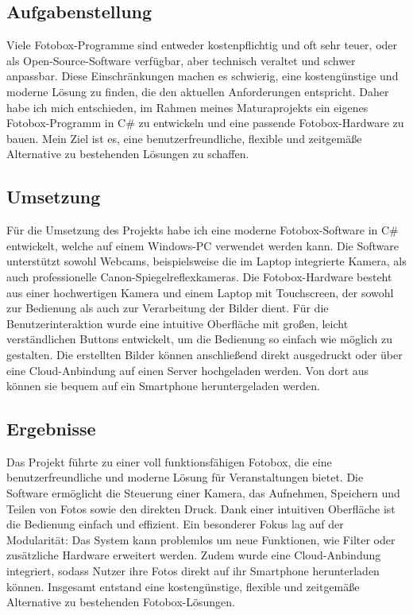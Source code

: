 \subsection{Aufgabenstellung}

Viele Fotobox-Programme sind entweder kostenpflichtig und oft sehr teuer, oder 
als Open-Source-Software verfügbar, aber technisch veraltet und schwer anpassbar.
Diese Einschränkungen machen es schwierig, eine kostengünstige und moderne
Lösung zu finden, die den aktuellen Anforderungen entspricht.
Daher habe ich mich entschieden, im Rahmen meines Maturaprojekts ein eigenes
Fotobox-Programm in C\# zu entwickeln und eine passende Fotobox-Hardware zu bauen.
Mein Ziel ist es, eine benutzerfreundliche, flexible und zeitgemäße Alternative
zu bestehenden Lösungen zu schaffen.

\subsection{Umsetzung}

Für die Umsetzung des Projekts habe ich eine moderne Fotobox-Software in C\# entwickelt,
welche auf einem Windows-PC verwendet werden kann. Die Software unterstützt sowohl Webcams,
beispielsweise die im Laptop integrierte Kamera, als auch professionelle Canon-Spiegelreflexkameras.
Die Fotobox-Hardware besteht aus einer hochwertigen Kamera und einem Laptop mit Touchscreen,
der sowohl zur Bedienung als auch zur Verarbeitung der Bilder dient. 
Für die Benutzerinteraktion wurde eine intuitive Oberfläche mit großen,
leicht verständlichen Buttons entwickelt, um die Bedienung so einfach wie
möglich zu gestalten. Die erstellten Bilder können anschließend direkt
ausgedruckt oder über eine Cloud-Anbindung auf einen Server hochgeladen werden.
Von dort aus können sie bequem auf ein Smartphone heruntergeladen werden.

\subsection{Ergebnisse}

Das Projekt führte zu einer voll funktionsfähigen Fotobox, die eine
benutzerfreundliche und moderne Lösung für Veranstaltungen bietet.
Die Software ermöglicht die Steuerung einer Kamera, das Aufnehmen,
Speichern und Teilen von Fotos sowie den direkten Druck. Dank einer intuitiven
Oberfläche ist die Bedienung einfach und effizient.
Ein besonderer Fokus lag auf der Modularität: Das System kann problemlos
um neue Funktionen, wie Filter oder zusätzliche Hardware erweitert werden.
Zudem wurde eine Cloud-Anbindung integriert, sodass Nutzer ihre Fotos direkt
auf ihr Smartphone herunterladen können. Insgesamt entstand eine kostengünstige,
flexible und zeitgemäße Alternative zu bestehenden Fotobox-Lösungen.

\newpage